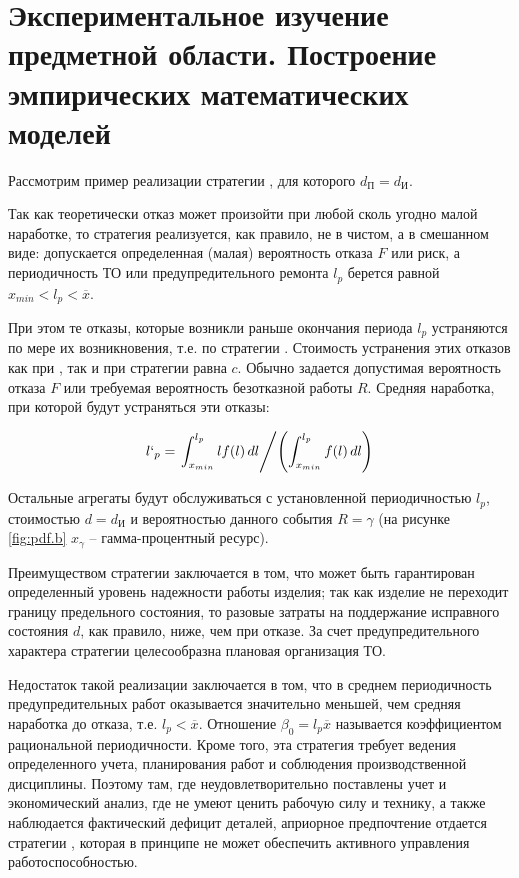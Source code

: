 \documentclass[../nirs.tex]{subfiles}
\begin{document}
\section{Экспериментальное изучение предметной области. Построение эмпирических
математических моделей}

Рассмотрим пример реализации стратегии , для которого $d_\text{П} =
d_\text{И}$.

Так как теоретически отказ может произойти при любой сколь угодно малой
наработке, то стратегия  реализуется, как правило, не в чистом, а в
смешанном виде: допускается определенная (малая) вероятность отказа $F$ или
риск, а периодичность ТО или предупредительного ремонта $l_p$ берется равной
$x_{min} < l_p < \overline{x}$.

При этом те отказы, которые возникли раньше окончания периода $l_p$ устраняются
по мере их возникновения, т.е. по стратегии . Стоимость устранения этих
отказов как при , так и при  стратегии равна $c$. Обычно задается
допустимая вероятность отказа $F$ или требуемая вероятность безотказной работы
$R$. Средняя наработка, при которой будут устраняться эти отказы:

\begin{equation*}
    l`_p =
    \left.
    \int_{x_{min}}^{l_p} lf(l)\,dl
    \middle/
    \left( \int_{x_{min}}^{l_p} f(l)\,dl \right)
    \right.
\end{equation*}

Остальные агрегаты будут обслуживаться с установленной периодичностью $l_p$,
стоимостью $d = d_\text{И}$ и вероятностью данного события $R = \gamma$ (на
рисунке \ref{fig:pdf.b} $x_\gamma$ -- гамма-процентный ресурс).

Преимуществом стратегии  заключается в том, что может быть гарантирован
определенный уровень надежности работы изделия; так как изделие не переходит
границу предельного состояния, то разовые затраты на поддержание исправного
состояния $d$, как правило, ниже, чем при отказе. За счет предупредительного
характера стратегии  целесообразна плановая организация ТО.

Недостаток такой реализации заключается в том, что в среднем периодичность
предупредительных работ оказывается значительно меньшей, чем средняя наработка
до отказа, т.е. $l_p < \overline{x}$. Отношение $\beta_0 = l_p \overline{x}$
называется коэффициентом рациональной периодичности. Кроме того, эта стратегия
требует ведения определенного учета, планирования работ и соблюдения
производственной дисциплины. Поэтому там, где неудовлетворительно поставлены
учет и экономический анализ, где не умеют ценить рабочую силу и технику, а также
наблюдается фактический дефицит деталей, априорное предпочтение отдается
стратегии , которая в принципе не может обеспечить активного управления
работоспособностью.
\end{document}
